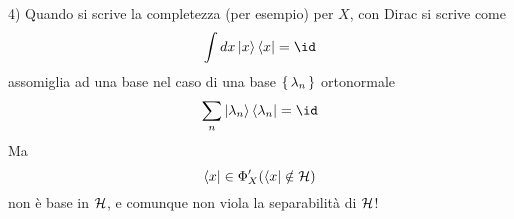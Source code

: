 \documentclass[../../FisicaTeorica.tex]{subfiles}
\begin{document}
4) Quando si scrive la completezza (per esempio) per $X$, con Dirac si scrive come
\[
\int \de x \ket x \bra x = \id
\]
assomiglia ad una base  nel caso di una base $\set{\lambda_n}$ ortonormale
\[
\sum_n \ket{\lambda_n} \bra{\lambda_n} = \id
\]
Ma 
\[
\bra x \in \Phi'_X (\bra x \notin \mathcal{H})
\]
non è base in $\mathcal{H}$, e comunque non viola la separabilità di $\mathcal{H}$!





\begin{comment}
Formalismo di Dirac
Spettro continuo \lambda\in \sigma_C\left(A\right), A\left|\lambda\right\rangle=\lambda\ket{\lambda} equazione agli autovalori \q{generalizzata}.
In che spazio sta \ket{\lambda}?
XF_\lambda\left(x\right)=\lambdaF_\lambda\left(x\right)
F_\lambda\left(x\right)=\delta \left(x-\lambda\right)\in \mathcal{S}^\prime\left(\mathbb{R}\right)
S\left(\mathbb{R}\right)\subset L^2\left(\mathbb{R}\right)\subset \mathcal{S}^\prime\left(\mathbb{R}\right)

Gerl'fand generalizza a \phi_A\subset H\subset \phi_A^\prime
Proprietà di \phi_A:
	1) \phi \left(A\right)\subseteq D\left(A\right)
	2) {\bar{\phi}}_A=H
	3) A è continuo in \phi_A nella topologia di \phi_A 
	4) \phi_A è nucleare

F_\lambda\in \phi_A′
\lambda\in \sigma \left(A\right)

Equazione agli autovalori: AF_\lambda=\lambdaF_\lambda che si deve intendere (come nel caso di S′)
AF_\lambda\left(\varphi\right)\equiv F_\lambda\left(A\varphi\right)=\lambdaF_\lambda\left(\varphi\right) \forall \phi \in \phi_A
 
Perciò: X\delta \left(\lambda-x\right)=\lambda\delta \left(\lambda-x\right) si intende come:
\int dx x \delta \left(\lambda-x\right)\phi \left(x\right)=\int dx \lambda\delta \left(\lambda-x\right)\phi \left(x\right) \forall \phi \in S(R)

Si dimostra che:
	1) \forall A autoaggiunto \exists  almeno un \phi_A
	2) Si può prendere \phi_A=S(\mathbb{R}^n) se A= polinomio di \vec{x} o \vec{p} + V(\vec{x})
	Con V\in C^\infty\left(\mathbb{R}^n\right) con derivate limitate. Se V ha discontinuità in un insieme di misura nulla sulla N, \phi_A=\left\{\varphi\in\mathcal{S}\left(\mathbb{R}^n\right)|\varphi\left(x\right)=0\ \ \ x\in N\right\}


\end{comment}
\end{document}
